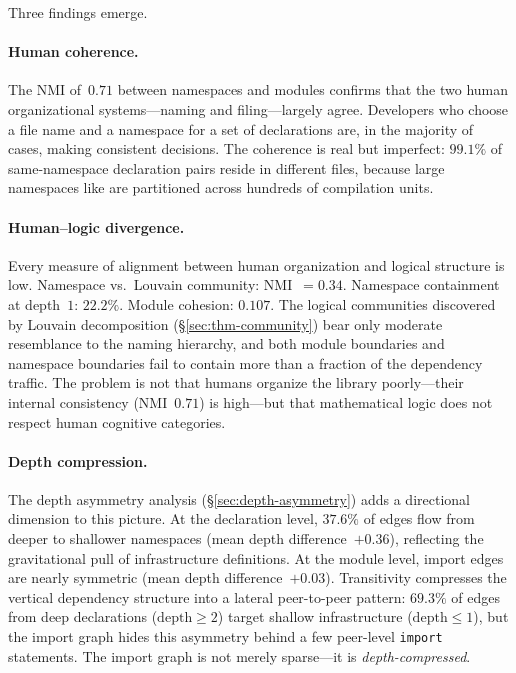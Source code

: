 Three findings emerge.

\paragraph{Human coherence.} The NMI of~$0.71$ between namespaces and modules confirms that the two human organizational systems---naming and filing---largely agree. Developers who choose a file name and a namespace for a set of declarations are, in the majority of cases, making consistent decisions. The coherence is real but imperfect: $99.1\%$ of same-namespace declaration pairs reside in different files, because large namespaces like  are partitioned across hundreds of compilation units.

\paragraph{Human--logic divergence.} Every measure of alignment between human organization and logical structure is low. Namespace vs.\ Louvain community: NMI~$= 0.34$. Namespace containment at depth~$1$: $22.2\%$. Module cohesion: $0.107$. The logical communities discovered by Louvain decomposition (\S\ref{sec:thm-community}) bear only moderate resemblance to the naming hierarchy, and both module boundaries and namespace boundaries fail to contain more than a fraction of the dependency traffic. The problem is not that humans organize the library poorly---their internal consistency (NMI~$0.71$) is high---but that mathematical logic does not respect human cognitive categories.

\paragraph{Depth compression.} The depth asymmetry analysis (\S\ref{sec:depth-asymmetry}) adds a directional dimension to this picture. At the declaration level, $37.6\%$ of edges flow from deeper to shallower namespaces (mean depth difference~$+0.36$), reflecting the gravitational pull of infrastructure definitions. At the module level, import edges are nearly symmetric (mean depth difference~$+0.03$). Transitivity compresses the vertical dependency structure into a lateral peer-to-peer pattern: $69.3\%$ of edges from deep declarations ($\mathrm{depth} \ge 2$) target shallow infrastructure ($\mathrm{depth} \le 1$), but the import graph hides this asymmetry behind a few peer-level \texttt{import} statements. The import graph is not merely sparse---it is \emph{depth-compressed}.

